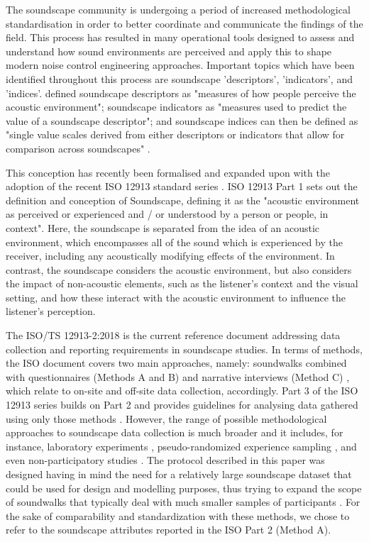  The soundscape community is undergoing a period of increased methodological standardisation in order to better coordinate and communicate the findings of the field. This process has resulted in many operational tools designed to assess and understand how sound environments are perceived and apply this to shape modern noise control engineering approaches. Important topics which have been identified throughout this process are soundscape 'descriptors', 'indicators', and 'indices'. \citet{Aletta2016Soundscape} defined soundscape descriptors as "measures of how people perceive the acoustic environment"; soundscape indicators as "measures used to predict the value of a soundscape descriptor"; and soundscape indices can then be defined as "single value scales derived from either descriptors or indicators that allow for comparison across soundscapes" \citep{Aletta2018Towards}.

 This conception has recently been formalised and expanded upon with the adoption of the recent ISO 12913 standard series \citep{ISO12913_1_2014IOS,ISO12913_2_2018IOS,ISO12913_3_2019IOS}. ISO 12913 Part 1 sets out the definition and conception of Soundscape, defining it as the "acoustic environment as perceived or experienced and / or understood by a person or people, in context". Here, the soundscape is separated from the idea of an acoustic environment, which encompasses all of the sound which is experienced by the receiver, including any acoustically modifying effects of the environment. In contrast, the soundscape considers the acoustic environment, but also considers the impact of non-acoustic elements, such as the listener's context and the visual setting, and how these interact with the acoustic environment to influence the listener's perception.

 The ISO/TS 12913-2:2018 is the current reference document addressing data collection and reporting requirements in soundscape studies. In terms of methods, the ISO document covers two main approaches, namely: soundwalks combined with questionnaires (Methods A and B) and narrative interviews (Method C) \citep{ISO12913_2_2018IOS}, which relate to on-site and off-site data collection, accordingly. Part 3 of the ISO 12913 series builds on Part 2 and provides guidelines for analysing data gathered using only those methods \citep{ISO12913_3_2019IOS}. However, the range of possible methodological approaches to soundscape data collection is much broader and it includes, for instance, laboratory experiments \citep{Aletta2016Soundscape,Sun2019Classification,Oberman2018Towards}, pseudo-randomized experience sampling \citep{Craig2017Experience}, and even non-participatory studies \citep{Lavia2018Non}. The protocol described in this paper was designed having in mind the need for a relatively large soundscape dataset that could be used for design and modelling purposes, thus trying to expand the scope of soundwalks that typically deal with much smaller samples of participants \citep{Engel2018Review}. For the sake of comparability and standardization with these methods, we chose to refer to the soundscape attributes reported in the ISO Part 2 (Method A).

